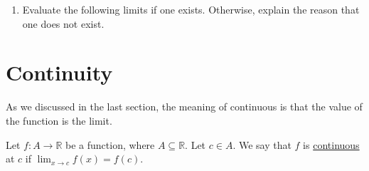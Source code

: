 \documentclass[11pt]{book}
\theoremstyle{break}
\theoremstyle{no_label}
\newcommand{\bbR}{\mathbb{R}}
\numberwithin{equation}{section}
\begin{document}
\begin{enumerate}[label=\arabic*.]
\begin{enumerate}
    \end{enumerate}
    \item Evaluate the following limits if one exists. Otherwise, explain the reason that one does not exist.
    \begin{enumerate}
    \end{enumerate}
    \setlength{\delimitershortfall}{13.5pt}
\end{enumerate}

\section{Continuity}

As we discussed in the last section, the meaning of continuous is that the value of the function is the limit.

\begin{definition}[Continuous]
    Let $f:A\to\bbR$ be a function, where $A\subseteq\bbR$. Let $c\in A$. We say that $f$ is \underline{continuous} at $c$ if $\displaystyle\lim_{x\to c}f(x)=f(c)$.
\end{definition}
\end{document}
